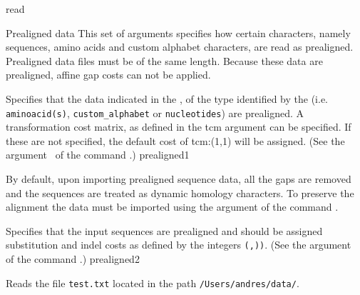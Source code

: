 \begin{command}{read}{}
\begin{arguments}
\begin{argumentgroup}{Prealigned data}
This set of arguments specifies how certain characters, namely sequences, amino acids 
and custom alphabet characters, are read as prealigned. Prealigned data files must be of the same length.
Because these data are prealigned, affine gap costs can not be applied.

{Specifies that the data indicated in the \poystring, of the type identified by the \poylident (i.e. 
\texttt{aminoacid(s)}, \texttt{custom\_alphabet} or \texttt{nucleotides}) are prealigned.
A transformation cost matrix, as defined in the tcm \poystring argument can be specified. 
If these are not specified, the default cost of tcm:(1,1) will be assigned. (See the argument~ 
of the command .)}
{prealigned1}

\begin{statement}
By default, upon importing prealigned sequence data, all the gaps are
removed and the sequences are treated as dynamic homology characters.
To preserve the alignment the data must be imported using the
 argument of the command .
\end{statement}

{Specifies that the input sequences are prealigned and should be
assigned substitution and indel costs as defined by the
 integers \texttt{(\poyint,\poyint))}. (See the 
argument~ 
of the command .)}
{prealigned2}

\end{argumentgroup}

\end{arguments}


\begin{poyexamples}

{Reads the file \texttt{test.txt} located in the path
\texttt{/Users/andres/data/}.}


\end{poyexamples}
\end{command}
